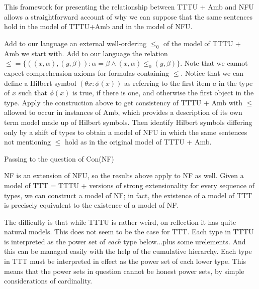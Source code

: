 \documentclass{slides}
\begin{document}
\begin{slide}

This framework for presenting the relationship between TTTU + Amb and NFU allows a straightforward account of why 
we can suppose that the same sentences hold in the model of TTTU+Amb and in the model of NFU.

Add to our language an external well-ordering $\leq_0$ of the model of TTTU + Amb we start with.  Add to our language the
relation $\leq = \{((x,\alpha),(y,\beta)):\alpha=\beta \wedge (x,\alpha) \leq_0 (y,\beta)\}$.  Note that we cannot expect comprehension axioms for formulas containing $\leq$.  Notice that we can define a Hilbert symbol $(\theta x:\phi(x))$ as referring to the first item $a$ in the type of $x$ such that $\phi(x)$ is true, if there is one, and otherwise the first object in the type.  Apply the construction above to get consistency of TTTU + Amb with $\leq$ allowed to occur in instances of Amb, which provides a description of its own term
model made up of Hilbert symbols.  Then identify Hilbert symbols differing only by a shift of types to obtain a model of NFU in which the same sentences not mentioning $\leq$ hold as in the original model of TTTU + Amb.



\end{slide}

\begin{slide}

{\Large Passing to the question of Con(NF)}

NF is an extension of NFU, so the results above apply to NF as well.  Given a model of TTT = TTTU + versions of strong extensionality for every sequence of types, we can construct a model of NF; in fact, the existence of a model of TTT is precisely equivalent to the existence of a model of NF.

The difficulty is that while TTTU is rather weird, on reflection it has quite natural models.  This does not seem to be the case for TTT.  Each type in TTTU is interpreted as the power set of {\em each} type below...plus some urelements.  And this can be managed easily with the help of the cumulative hierarchy.  Each type in TTT must be interpreted in effect as the power set of each lower type.  This means that the power sets in question cannot be honest power sets, by simple considerations of cardinality.

\end{slide}
\end{document}
